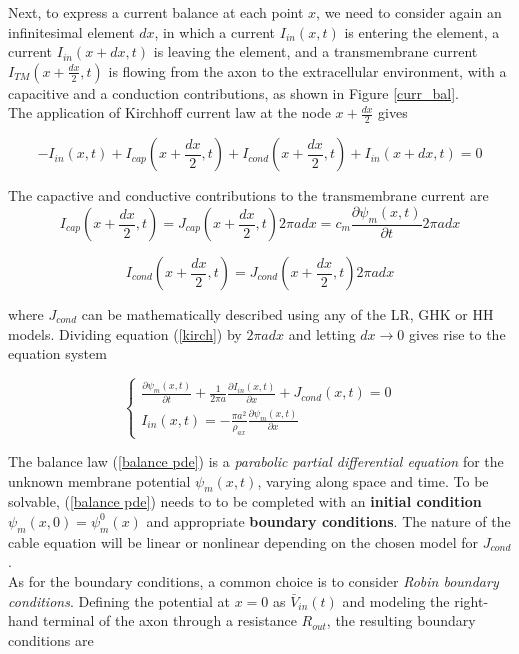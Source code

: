 \documentclass[12pt, a4paper]{report}
\begin{document}
Next, to express a current balance at each point $x$, we need to consider again an infinitesimal element $dx$, in which a current $I_{in}(x,t)$ is entering the element, a current $I_{in}(x+dx,t)$ is leaving the element, and a transmembrane current $I_{TM}(x+\frac{dx}{2},t)$ is flowing from the axon to the extracellular environment, with a capacitive and a conduction contributions, as shown in Figure \ref*{curr_bal}.\\
The application of Kirchhoff current law at the node  $x+\frac{dx}{2}$ gives

\begin{equation}
- I_{in}(x,t) + I_{cap}(x+\frac{dx}{2},t) + I_{cond}(x+\frac{dx}{2},t) + I_{in}(x+dx,t) = 0 \label{kirch}
\end{equation}

The capactive and conductive contributions to the transmembrane current are
\begin{equation}
I_{cap}(x+\frac{dx}{2},t) = J_{cap}(x+\frac{dx}{2},t) 2 \pi a dx = c_m \frac{\partial \psi_m(x,t)}{\partial t} 2 \pi a dx 
\end{equation}

\begin{equation}
I_{cond}(x+\frac{dx}{2},t) = J_{cond}(x+\frac{dx}{2},t) 2 \pi a dx 
\end{equation}

where $J_{cond}$ can be mathematically described using any of the LR, GHK or HH models. Dividing equation (\ref{kirch})  by $2 \pi a dx $ and letting $dx \rightarrow 0$ gives rise to the equation system

\begin{equation}
\begin{cases}
\frac{\partial \psi_m(x,t)}{\partial t} + \frac{1}{2 \pi a }\frac{\partial I_{in}(x,t)}{\partial x} + J_{cond}(x,t) = 0 \\
I_{in}(x,t) = -\frac{\pi a^2}{\rho_{ax}}\frac{\partial \psi_m(x,t)}{\partial x}
\end{cases} \label{balance pde}
\end{equation}

The balance law (\ref*{balance pde}) is a \textit{parabolic partial differential equation} for the unknown membrane potential $\psi_m(x,t) $, varying along space and time. To be solvable, (\ref*{balance pde}) needs to to be completed with an \textbf{initial condition} $ \psi_m (x,0) = \psi_m^0(x)$ and appropriate \textbf{boundary conditions}. The nature of the cable equation will be linear or nonlinear depending on the chosen model for $J_{cond}$.\\
As for the boundary conditions, a common choice is to consider \textit{Robin boundary conditions}. Defining the potential at $x=0$ as $\bar{V}_{in}(t)$ and modeling the right-hand terminal of the axon through a resistance $R_{out}$, the resulting boundary conditions are
\end{document}
